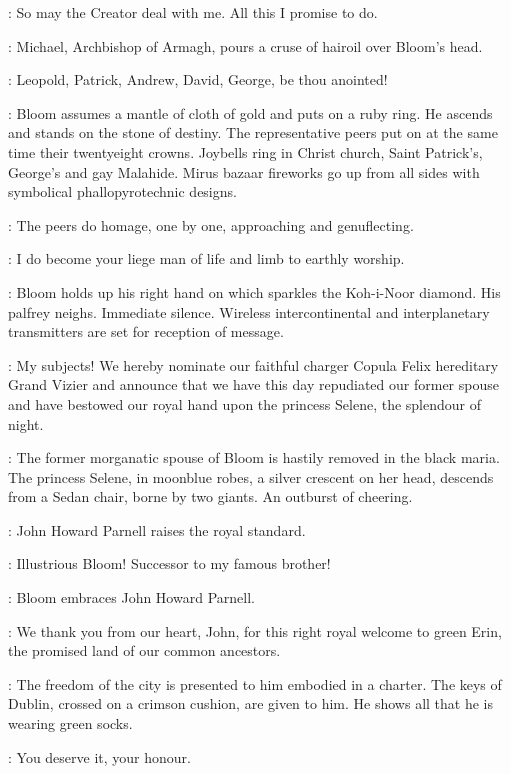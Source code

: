 \Bloom:
So may the Creator deal with me.
All this I promise to do.

:
Michael,
Archbishop of Armagh,
pours a cruse of hairoil over Bloom's head.

\MikeArmagh:
Leopold,
Patrick,
Andrew,
David,
George,
be thou anointed!

:
Bloom assumes a mantle of cloth of gold and puts on a ruby ring.
He ascends and stands on the stone of destiny.
The representative peers put on at the same time their twentyeight crowns.
Joybells ring in Christ church,
Saint Patrick's,
George's and gay Malahide.
Mirus bazaar fireworks go up from all sides with symbolical phallopyrotechnic designs.

:
The peers do homage,
one by one,
approaching and genuflecting.

\Peers:
I do become your liege man of life and limb to earthly worship.

:
Bloom holds up his right hand on which sparkles the Koh-i-Noor diamond.
His palfrey neighs.
Immediate silence.
Wireless intercontinental and interplanetary transmitters are set for reception of message.

\Bloom:
My subjects!
We hereby nominate our faithful charger Copula Felix hereditary Grand Vizier
and announce that we have this day repudiated our former spouse
and have bestowed our royal hand upon the princess Selene,
the splendour of night.

:
The former morganatic spouse of Bloom is hastily removed in the black maria.
The princess Selene,
in moonblue robes,
a silver crescent on her head,
descends from a Sedan chair,
borne by two giants.
An outburst of cheering.

:
John Howard Parnell raises the royal standard.

\Parnell:
Illustrious Bloom!
Successor to my famous brother!

:
Bloom embraces John Howard Parnell.

\Bloom:
We thank you from our heart,
John,
for this right royal welcome to green Erin,
the promised land of our common ancestors.

:
The freedom of the city is presented to him embodied in a charter.
The keys of Dublin,
crossed on a crimson cushion,
are given to him.%
He shows all that he is wearing green socks.

\Kernan[2]:
You deserve it,
your honour.

